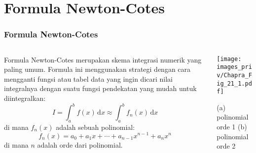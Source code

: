 \section{Formula Newton-Cotes}

\begin{frame}
\frametitle{Formula Newton-Cotes}
\fontsize{9pt}{8.0}\selectfont

\begin{columns}

\begin{column}{0.5\textwidth}
Formula Newton-Cotes merupakan skema integrasi numerik yang paling umum.
Formula ini menggunakan strategi dengan cara mengganti fungsi atau tabel data
yang ingin dicari nilai integralnya dengan suatu fungsi pendekatan yang
mudah untuk diintegralkan:
\begin{equation*}
I = \int_{a}^{b} f(x) \, \mathrm{d}x \approx \int_{a}^{b} f_{n}(x) \, \mathrm{d}x
\end{equation*}
di mana $f_{n}(x)$ adalah sebuah polinomial:
\begin{equation*}
f_{n}(x) = a_{0} + a_{1}x + \cdots + a_{n-1} x^{n-1} + a_{n} x^{n}
\end{equation*}
di mana $n$ adalah orde dari polinomial.    
\end{column}

\begin{column}{0.5\textwidth}
{\centering
\texttt{[image: images\_priv/Chapra\_Fig\_21\_1.pdf]}
\par}

(a) polinomial orde 1 (b) polinomial orde 2
\end{column}

\end{columns}



\end{frame}
